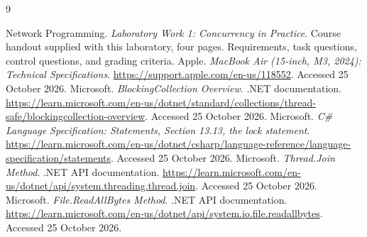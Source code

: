 \begin{thebibliography}{9}
\singlespacing\normalsize\raggedright
{}
 Network Programming. \emph{Laboratory Work 1: Concurrency in Practice}. Course handout supplied with this laboratory, four pages. Requirements, task questions, control questions, and grading criteria.
 Apple. \emph{MacBook Air (15-inch, M3, 2024): Technical Specifications}. \url{https://support.apple.com/en-us/118552}. Accessed 25 October 2026.
 Microsoft. \emph{BlockingCollection Overview}. .NET documentation. \url{https://learn.microsoft.com/en-us/dotnet/standard/collections/thread-safe/blockingcollection-overview}. Accessed 25 October 2026.
 Microsoft. \emph{C\# Language Specification: Statements, Section 13.13, the lock statement}. \url{https://learn.microsoft.com/en-us/dotnet/csharp/language-reference/language-specification/statements}. Accessed 25 October 2026.
 Microsoft. \emph{Thread.Join Method}. .NET API documentation. \url{https://learn.microsoft.com/en-us/dotnet/api/system.threading.thread.join}. Accessed 25 October 2026.
 Microsoft. \emph{File.ReadAllBytes Method}. .NET API documentation. \url{https://learn.microsoft.com/en-us/dotnet/api/system.io.file.readallbytes}. Accessed 25 October 2026.
\end{thebibliography}
